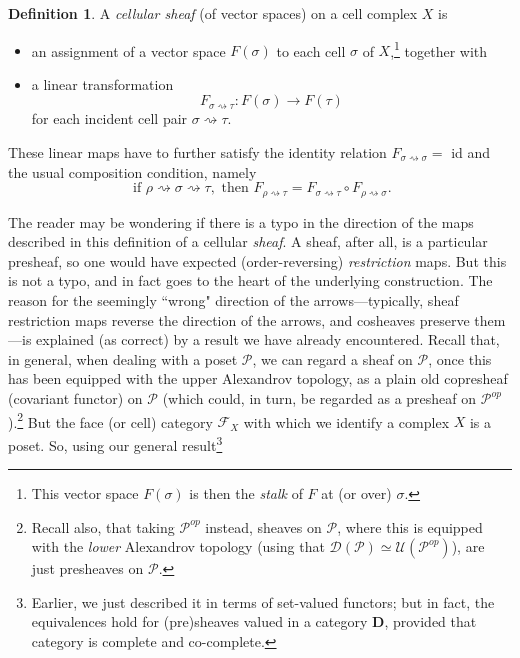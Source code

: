 \documentclass[a4paper]{book}
\theoremstyle{definition}
\theoremstyle{definition}
\newtheorem{definition}{Definition}[section]
\theoremstyle{definition}
\theoremstyle{theorem}
\theoremstyle{definition}
\begin{document}
	\begin{definition}
		A \textit{cellular sheaf} (of vector spaces) on a cell complex $X$ is 
		\begin{itemize}
			\item an assignment of a vector space $F(\sigma)$ to each cell $\sigma$ of $X$,\footnote{This vector space $F(\sigma)$ is then the \textit{stalk} of $F$ at (or over) $\sigma$.} together with 
			\item a linear transformation 
			\begin{equation*} 
			F_{\sigma \rightsquigarrow \tau}: F(\sigma) \rightarrow F(\tau)
			\end{equation*} for each incident cell pair $\sigma \rightsquigarrow \tau$. 
		\end{itemize}
		These linear maps have to further satisfy the identity relation $F_{\sigma \rightsquigarrow \sigma} = $ id and the usual composition condition, namely
		\begin{equation*}
		\text{ if } \rho \rightsquigarrow \sigma \rightsquigarrow \tau , \text{ then } F_{\rho \rightsquigarrow \tau} = F_{\sigma \rightsquigarrow \tau} \circ F_{\rho \rightsquigarrow \sigma}. 
		\end{equation*}
	\end{definition} 
The reader may be wondering if there is a typo in the direction of the maps described in this definition of a cellular \textit{sheaf}. A sheaf, after all, is a particular presheaf, so one would have expected (order-reversing) \textit{restriction} maps. But this is not a typo, and in fact goes to the heart of the underlying construction. The reason for the seemingly ``wrong" direction of the arrows---typically, sheaf restriction maps reverse the direction of the arrows, and cosheaves preserve them---is explained (as correct) by a result we have already encountered. Recall that, in general, when dealing with a poset $\mathcal{P}$, we can regard a sheaf on $\mathcal{P}$, once this has been equipped with the upper Alexandrov topology, as a plain old copresheaf (covariant functor) on $\mathcal{P}$ (which could, in turn, be regarded as a presheaf on $\mathcal{P}^{op}$).\footnote{Recall also, that taking $\mathcal{P}^{op}$ instead, sheaves on $\mathcal{P}$, where this is equipped with the \textit{lower} Alexandrov topology (using that $\mathcal{D}(\mathcal{P}) \simeq \mathcal{U}(\mathcal{P}^{op})$), are just presheaves on $\mathcal{P}$.} But the face (or cell) category $\mathcal{F}_{X}$ with which we identify a complex $X$ is a poset. So, using our general result\footnote{Earlier, we just described it in terms of set-valued functors; but in fact, the equivalences hold for (pre)sheaves valued in a category $\textbf{D}$, provided that category is complete and co-complete.} 
\end{document}
